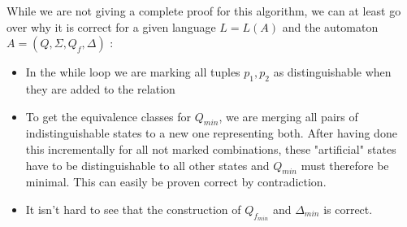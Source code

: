 \documentclass{llncs}
\begin{document}
\noindent
While we are not giving a complete proof for this algorithm, we can at least go over why it is correct for a given language \(L = L(A)\) and the automaton \(A = (Q, \Sigma, Q_f, \Delta) \) \cite{tata-nfta}:
\begin{itemize}
	\item In the while loop we are marking all tuples \(p_1, p_2\) as distinguishable when they are added to the relation
	\\
	\item To get the equivalence classes for \(Q_{min}\), we are merging all pairs of indistinguishable states to a new one representing both. After having done this incrementally for all not marked combinations, these "artificial" states have to be distinguishable to all other states and \(Q_{min}\) must therefore be minimal. This can easily be proven correct by contradiction.
	\\
	\item It isn't hard to see that the construction of \(Q_{f_{min}}\) and \(\Delta_{min} \) is correct.
\end{itemize}
\end{document}
